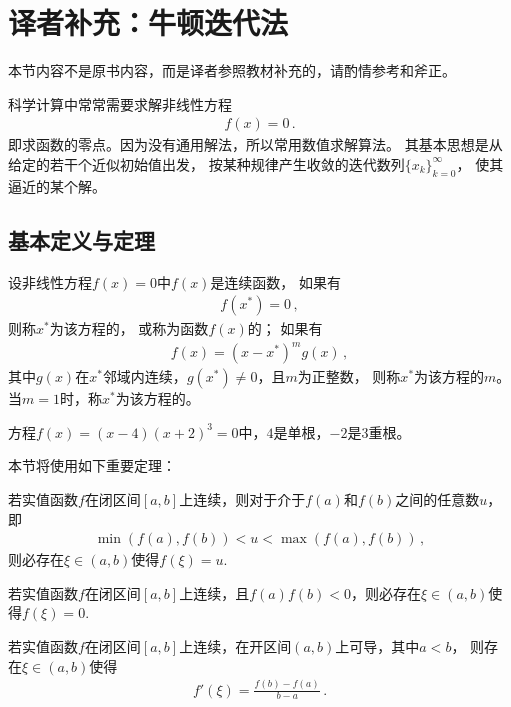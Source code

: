 \section{译者补充：牛顿迭代法}\label{sec:译者补充：牛顿迭代法}
\begin{remark}
    本节内容不是原书内容，而是译者参照教材补充的，请酌情参考和斧正。
\end{remark}

科学计算中常常需要求解非线性方程
\begin{align}\label{eq:02ex0301}
    f(x)=0\, .
\end{align}
即求函数的零点。因为没有通用解法，所以常用数值求解算法。
其基本思想是从给定的若干个近似初始值出发，
按某种规律产生收敛的迭代数列$\{x_k\}_{k=0}^{\infty}$，
使其逼近的某个解。

\subsection{基本定义与定理}\label{sub:基本定义与定理02}
\begin{definition}
    设非线性方程$f(x)=0$中$f(x)$是连续函数，
    如果有
    \begin{align}\label{eq:02ex0302}
        f(x^*)=0\, ,
    \end{align}
    则称$x^*$为该方程的，
    或称为函数$f(x)$的；
    如果有
    \begin{align}\label{eq:02ex0303}
        f(x)=(x-x^*)^mg(x)\, ,
    \end{align}
    其中$g(x)$在$x^*$邻域内连续，$g(x^*)\neq0$，且$m$为正整数，
    则称$x^*$为该方程的$m$。
    当$m=1$时，称$x^*$为该方程的。
\end{definition}

\begin{example}
    方程$f(x)=(x-4)(x+2)^3=0$中，$4$是单根，$-2$是3重根。
\end{example}

本节将使用如下重要定理：
\begin{theorem}
    若实值函数$f$在闭区间$[a,b]$上连续，则对于介于$f(a)$和$f(b)$之间的任意数$u$，即
    \begin{align}\label{eq:02ex0304}
        \min(f(a),f(b))<u<\max(f(a),f(b))\, ,
    \end{align}
    则必存在$\xi\in(a,b)$使得$f(\xi)=u$.
\end{theorem}
\begin{corollary}
    若实值函数$f$在闭区间$[a,b]$上连续，且$f(a)f(b)<0$，则必存在$\xi\in(a,b)$使得$f(\xi)=0$.
\end{corollary}
\begin{theorem}
    若实值函数$f$在闭区间$[a,b]$上连续，在开区间$(a,b)$上可导，其中$a<b$，
    则存在$\xi\in(a,b)$使得
    \begin{align}\label{eq:02ex0305}
        f'(\xi)=\frac{f(b)-f(a)}{b-a}\, .
    \end{align}
\end{theorem}

